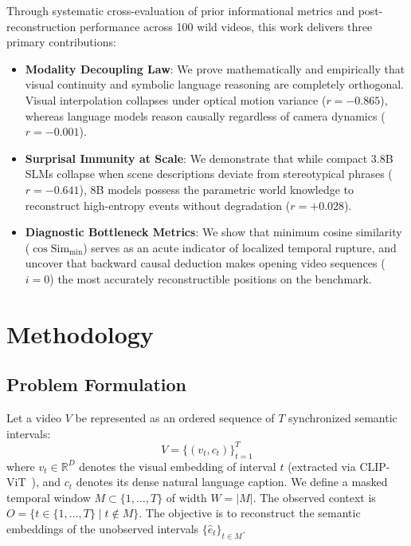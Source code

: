 \documentclass[10pt,twocolumn,letterpaper]{article}
\begin{document}
Through systematic cross-evaluation of prior informational metrics and post-reconstruction performance across 100 wild videos, this work delivers three primary contributions:
\begin{itemize}[leftmargin=*,noitemsep,topsep=2pt]
    \item \textbf{Modality Decoupling Law}: We prove mathematically and empirically that visual continuity and symbolic language reasoning are completely orthogonal. Visual interpolation collapses under optical motion variance (\(r = -0.865\)), whereas language models reason causally regardless of camera dynamics (\(r = -0.001\)).
    \item \textbf{Surprisal Immunity at Scale}: We demonstrate that while compact 3.8B SLMs collapse when scene descriptions deviate from stereotypical phrases (\(r = -0.641\)), 8B models possess the parametric world knowledge to reconstruct high-entropy events without degradation (\(r = +0.028\)).
    \item \textbf{Diagnostic Bottleneck Metrics}: We show that minimum cosine similarity (\(\cos\text{Sim}_{\min}\)) serves as an acute indicator of localized temporal rupture, and uncover that backward causal deduction makes opening video sequences (\(i=0\)) the most accurately reconstructible positions on the benchmark.
\end{itemize}

\section{Methodology}
\label{sec:method}

\subsection{Problem Formulation}
Let a video \(V\) be represented as an ordered sequence of \(T\) synchronized semantic intervals:
\begin{equation}
    V = \{(v_t, c_t)\}_{t=1}^T
\end{equation}
where \(v_t \in \mathbb{R}^D\) denotes the visual embedding of interval \(t\) (extracted via CLIP-ViT~\cite{radford2021learning}), and \(c_t\) denotes its dense natural language caption. We define a masked temporal window \(M \subset \{1, \dots, T\}\) of width \(W = |M|\). The observed context is \(O = \{t \in \{1, \dots, T\} \mid t \notin M\}\). The objective is to reconstruct the semantic embeddings of the unobserved intervals \(\{\hat{e}_t\}_{t \in M}\).
\end{document}
